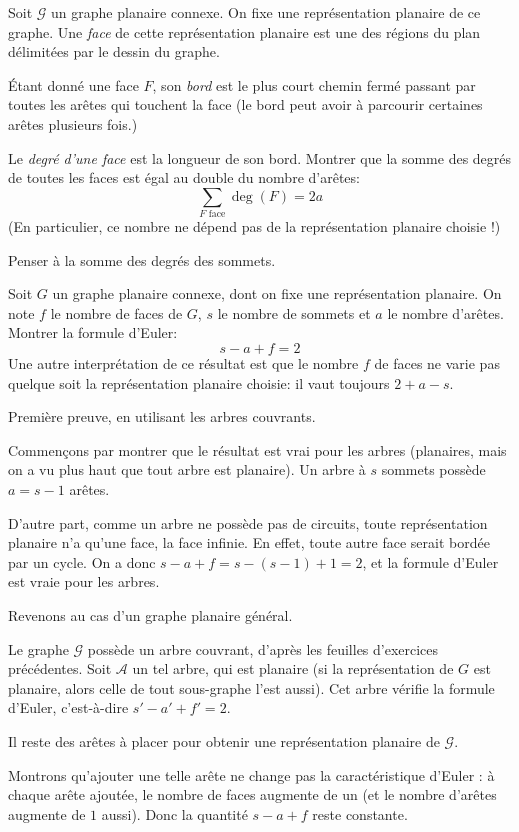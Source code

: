 \begin{exo}
Soit $\mathcal G$ un graphe planaire connexe. On fixe une représentation planaire de ce graphe. Une \emph{face} de cette représentation planaire est une des régions du plan délimitées par le dessin du graphe.

Étant donné une face $F$, son \emph{bord} est le plus court chemin fermé passant par toutes les arêtes qui touchent la face (le bord peut avoir à parcourir certaines arêtes plusieurs fois.)

Le \emph{degré d'une face} est la longueur de son bord. Montrer que la somme des degrés de toutes les faces est égal au double du nombre d'arêtes:
\[\boxed{\sum_{F\text{ face}}\deg(F) = 2a}\]
(En particulier, ce nombre ne dépend pas de la représentation planaire choisie !)
\begin{hint}
Penser à la somme des degrés des sommets.
\end{hint}
\end{exo}

\begin{exo}
Soit $G$ un graphe planaire connexe, dont on fixe une représentation planaire. 
On note $f$ le nombre de faces de $G$, $s$ le nombre de sommets et $a$ le nombre d'arêtes. Montrer la formule d'Euler:
\[
\boxed{s-a+f=2}
\]
Une autre interprétation de ce résultat est que le nombre $f$ de faces ne varie pas quelque soit la représentation planaire choisie: il vaut toujours $2+a-s$.
\begin{sol}Première preuve, en utilisant les arbres couvrants.

Commençons par montrer que le résultat est vrai pour les arbres (planaires, mais on a vu plus haut que tout arbre est planaire). Un arbre à $s$ sommets possède $a=s-1$ arêtes.

D'autre part, comme un arbre ne possède pas de circuits, toute représentation planaire n'a qu'une face, la face infinie. En effet, toute autre face serait bordée par un cycle. On a donc $s-a+f = s-(s-1)+1=2$, et la formule d'Euler est vraie pour les arbres.

Revenons au cas d'un graphe planaire général.

Le graphe $\mathcal G$ possède un arbre couvrant, d'après les feuilles d'exercices précédentes. Soit $\mathcal A$ un tel arbre, qui est planaire (si la représentation de $G$ est planaire, alors celle de tout sous-graphe l'est aussi). Cet arbre vérifie la formule d'Euler, c'est-à-dire $s'-a'+f'=2$.

Il reste des arêtes à placer pour obtenir une représentation planaire de $\mathcal G$.

Montrons qu'ajouter une telle arête ne change pas la caractéristique d'Euler : à chaque arête ajoutée, le nombre de faces augmente de un (et le nombre d'arêtes augmente de $1$ aussi). Donc la quantité $s-a+f$ reste constante.
\end{sol}

\end{exo}

